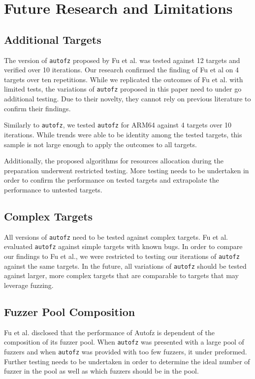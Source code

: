 \section{Future Research and Limitations}
\subsection{Additional Targets} The version of \texttt{autofz} proposed by Fu et al. 
was tested against 12 targets and verified over 10 iterations. Our research  
confirmed the finding of Fu et al on 4 targets over ten repetitions. While we 
replicated the outcomes of Fu et al. with limited tests, the variations 
of \texttt{autofz} proposed in this paper need to under go additional testing. Due to their 
novelty, they cannot rely on previous literature to confirm their findings.

Similarly to \texttt{autofz}, we tested \texttt{autofz} for ARM64 against 4 targets over 10 
iterations. While trends were able to be identity among the tested targets, this
sample is not large enough to apply the outcomes to all targets. 

Additionally, the proposed algorithms for resources allocation during the preparation
underwent restricted testing. More testing needs to be undertaken in order to confirm
the performance on tested targets and extrapolate the performance to untested targets.

\subsection{Complex Targets} All versions of \texttt{autofz} need to be tested against 
complex targets. Fu et al. evaluated \texttt{autofz} against simple targets with known bugs. In 
order to compare our findings to Fu et al., we were restricted to testing our 
iterations of \texttt{autofz} against the same targets. In the future, all variations of 
\texttt{autofz} should be tested against larger, more complex targets that are comparable to
targets that may leverage fuzzing.

\subsection{Fuzzer Pool Composition} Fu et al. disclosed that the performance of
Autofz is dependent of the composition of its fuzzer pool. When \texttt{autofz} was presented
with a large pool of fuzzers and when \texttt{autofz} was provided with too few fuzzers, it 
under preformed. Further testing needs to be undertaken in order to determine the ideal
number of fuzzer in the pool as well as which fuzzers should be in the pool.
